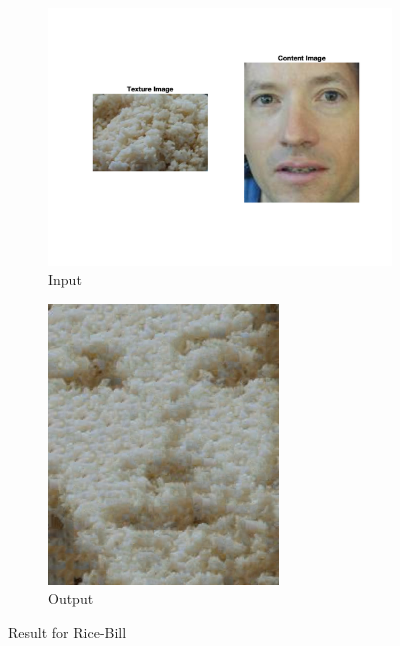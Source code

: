 \documentclass[10pt,twocolumn,letterpaper]{article}
\begin{document}
\begin{figure}[h]
    \centering
    \begin{subfigure}[h]{0.4\textwidth}
        \centering
        \includegraphics[trim={2cm 4cm 2cm 2cm}, clip, scale=0.5]{../results/bsize/inp_rice_bill.png}
        \caption{Input}
    \end{subfigure}
    \hfill
    \begin{subfigure}[h]{0.5\textwidth}
       \centering
       \includegraphics[scale=0.6]{../results/bsize/out_rice_bill_B_20_bdr_0_800000.png}
       \caption{Output}
   \end{subfigure}
   \caption{Result for Rice-Bill}
   \label{fig:ap_bs}
\end{figure}
\end{document}
